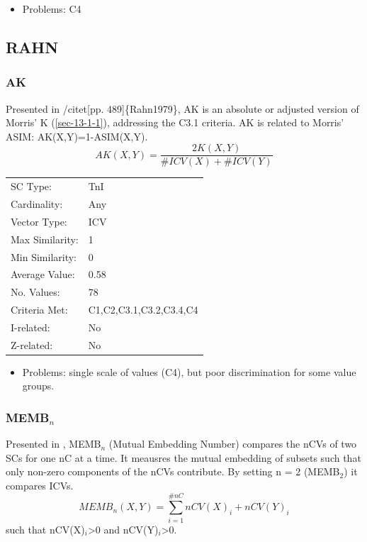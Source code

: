 \documentclass{article}
\begin{document}
\begin{itemize}
\item Problems: C4
\end{itemize}
\subsection{RAHN}
\label{sec-13-5}
\subsubsection{AK}
\label{sec-13-5-1}

Presented in /citet[pp. 489]\{Rahn1979\}, AK is an absolute or adjusted
version of Morris' K (\ref{sec-13-1-1}), addressing the C3.1 criteria. AK is related
to Morris' ASIM: AK(X,Y)=1-ASIM(X,Y).
$$AK\left(X,Y\right)=\frac{2K\left(X,Y\right)}{\#ICV\left(X\right)+\#ICV\left(Y\right)}$$

\begin{center}
\begin{tabular}{ll}
 SC Type:         &  TnI                      \\
 Cardinality:     &  Any                      \\
 Vector Type:     &  ICV                      \\
 Max Similarity:  &  1                        \\
 Min Similarity:  &  0                        \\
 Average Value:   &  0.58                     \\
 No. Values:      &  78                       \\
 Criteria Met:    &  C1,C2,C3.1,C3.2,C3.4,C4  \\
 I-related:       &  No                       \\
 Z-related:       &  No                       \\
\end{tabular}
\end{center}


\begin{itemize}
\item Problems: single scale of values (C4), but poor discrimination for
  some value groups.
\end{itemize}
\subsubsection{MEMB$_{n}$}
\label{sec-13-5-2}

Presented in \citet[pp. 492]{Rahn1979}, MEMB$_{n}$ (Mutual Embedding
Number) compares the nCVs of two SCs for one nC at a time. It meausres
the mutual embedding of subsets such that only non-zero components of
the nCVs contribute. By setting n = 2 (MEMB$_{2}$) it compares ICVs.
$$MEMB_{n}\left(X,Y\right)=\sum_{i=1}^{\#nC}{nCV(X)_{i}+nCV(Y)_{i}}$$
such that nCV(X)$_{i}$>0 and nCV(Y)$_{i}$>0. 
\end{document}
